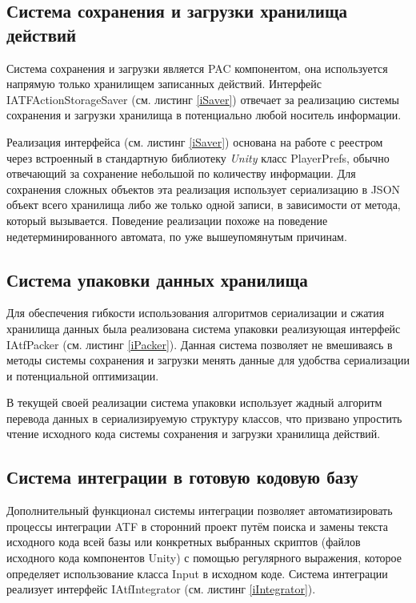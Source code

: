 \subsection{Система сохранения и загрузки хранилища действий}
Система сохранения и загрузки является PAC компонентом, она используется напрямую только хранилищем записанных действий. Интерфейс IATFActionStorageSaver (см. листинг \ref{iSaver}) отвечает за реализацию системы сохранения и загрузки хранилища в потенциально любой носитель информации.

Реализация интерфейса (см. листинг \ref{iSaver}) основана на работе с реестром через встроенный в стандартную библиотеку \textit{Unity} класс PlayerPrefs, обычно отвечающий за сохранение небольшой по количеству информации. Для сохранения сложных объектов эта реализация использует сериализацию в JSON объект всего хранилища либо же только одной записи, в зависимости от метода, который вызывается. Поведение реализации похоже на поведение недетерминированного автомата, по уже вышеупомянутым причинам.

\subsection{Система упаковки данных хранилища}
Для обеспечения гибкости использования алгоритмов сериализации и сжатия хранилища данных была реализована система упаковки реализующая интерфейс IAtfPacker (см. листинг \ref{iPacker}). Данная система позволяет не вмешиваясь в методы системы сохранения и загрузки менять данные для удобства сериализации и потенциальной оптимизации.

В текущей своей реализации система упаковки использует жадный алгоритм перевода данных в сериализируемую структуру классов, что призвано упростить чтение исходного кода системы сохранения и загрузки хранилища действий.

\subsection{Система интеграции в готовую кодовую базу}
Дополнительный функционал системы интеграции позволяет автоматизировать процессы интеграции ATF в сторонний проект путём поиска и замены текста исходного кода всей базы или конкретных выбранных скриптов (файлов исходного кода компонентов Unity) с помощью регулярного выражения, которое определяет использование класса Input в исходном коде. Система интеграции реализует интерфейс IAtfIntegrator (см. листинг \ref{iIntegrator}).

